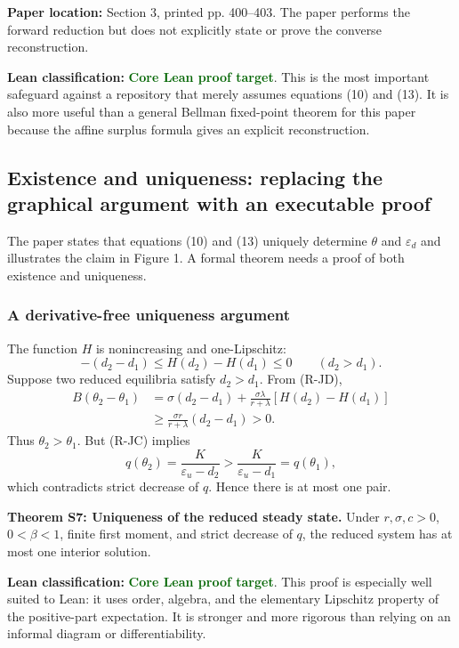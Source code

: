 \documentclass[11pt]{article}
\newcommand{\epsd}{\varepsilon_d}
\newcommand{\epsu}{\varepsilon_u}
\newcommand{\paperloc}[1]{\textbf{Paper location:} #1}
\newcommand{\leanclass}[1]{\textbf{Lean classification:} #1}
\newcommand{\core}{\textcolor{darkGreen}{\textbf{Core Lean proof target}}}
\newcommand{\resultname}[1]{\medskip\noindent\textbf{#1.}}
\begin{document}
\paperloc{Section 3, printed pp. 400--403. The paper performs the forward reduction but does not explicitly state or prove the converse reconstruction.}

\leanclass{\core.}
This is the most important safeguard against a repository that merely assumes equations (10) and (13). It is also more useful than a general Bellman fixed-point theorem for this paper because the affine surplus formula gives an explicit reconstruction.

\subsection{Existence and uniqueness: replacing the graphical argument with an executable proof}

The paper states that equations (10) and (13) uniquely determine $\theta$ and $\epsd$ and illustrates the claim in Figure 1. A formal theorem needs a proof of both existence and uniqueness.

\subsubsection*{A derivative-free uniqueness argument}

The function $H$ is nonincreasing and one-Lipschitz:
\begin{equation}
 -(d_2-d_1)\le H(d_2)-H(d_1)\le 0
 \qquad(d_2>d_1). \tag{H-Lip}
\end{equation}
Suppose two reduced equilibria satisfy $d_2>d_1$. From (R-JD),
\begin{align*}
 B(\theta_2-\theta_1)
 &=\sigma(d_2-d_1)
 +\frac{\sigma\lambda}{r+\lambda}[H(d_2)-H(d_1)]\\
 &\ge \frac{\sigma r}{r+\lambda}(d_2-d_1)>0.
\end{align*}
Thus $\theta_2>\theta_1$. But (R-JC) implies
\[
 q(\theta_2)=\frac{K}{\epsu-d_2}
 >\frac{K}{\epsu-d_1}=q(\theta_1),
\]
which contradicts strict decrease of $q$. Hence there is at most one pair.

\resultname{Theorem S7: Uniqueness of the reduced steady state}
Under $r,\sigma,c>0$, $0<\beta<1$, finite first moment, and strict decrease of $q$, the reduced system has at most one interior solution.

\leanclass{\core.}
This proof is especially well suited to Lean: it uses order, algebra, and the elementary Lipschitz property of the positive-part expectation. It is stronger and more rigorous than relying on an informal diagram or differentiability.
\end{document}

